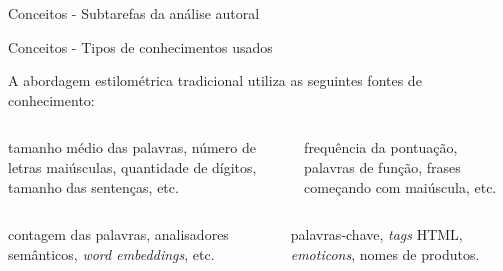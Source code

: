 \begin{frame}{Conceitos - Subtarefas da análise autoral}
\end{frame}


\begin{frame}{Conceitos - Tipos de conhecimentos usados}

A abordagem estilométrica tradicional utiliza as seguintes fontes de conhecimento:

	\begin{columns}
	\begin{column}{0.48\textwidth}
		\begin{tcolorbox}[colback=gray!5!white,colframe=gray!75!black,height=2.4cm,valign=center,title=Categoria lexical]\selectFont
			tamanho médio das palavras, número de letras maiúsculas, quantidade de dígitos, tamanho das sentenças, etc.               
		\end{tcolorbox}
	\end{column}
	\begin{column}{0.48\textwidth}
		\begin{tcolorbox}[colback=gray!5!white,colframe=gray!75!black,height=2.4cm,valign=center,title=Categoria sintática]\selectFont
			frequência da pontuação, palavras de função, frases começando com maiúscula, etc.               
		\end{tcolorbox}
	\end{column}
	\end{columns}


	\begin{columns}
		\begin{column}{0.48\textwidth}
			\begin{tcolorbox}[colback=gray!5!white,colframe=gray!75!black,height=2.4cm,valign=center,title=Categoria semântica]\selectFont
				contagem das palavras, analisadores semânticos, {\it word embeddings}, etc.               
			\end{tcolorbox}
		\end{column}
		\begin{column}{0.48\textwidth}
			\begin{tcolorbox}[colback=gray!5!white,colframe=gray!75!black,height=2.4cm,valign=center,title=Categoria específica de domínio]\selectFont
				 palavras-chave, {\it tags} HTML, {\it emoticons}, nomes de produtos.               
			\end{tcolorbox}
		\end{column}
	\end{columns}
\end{frame}


